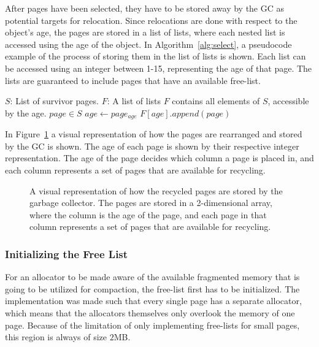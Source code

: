 After pages have been selected, they have to be stored away by the GC as potential targets for relocation. Since relocations are done with respect to the object's age, the pages are stored in a list of lists, where each nested list is accessed using the age of the object. In Algorithm~\ref{alg:select}, a pseudocode example of the process of storing them in the list of lists is shown. Each list can be accessed using an integer between 1-15, representing the age of that page. The lists are guaranteed to include pages that have an available free-list. 

\begin{algorithm}[H]
      \caption{$(O, T, F)$}
      \label{alg:select}
      \begin{algorithmic}[1]
                \Require 
                \Statex $S$: List of survivor pages.
                \Statex $F$: A list of lists
                \Ensure 
                \Statex $F$ contains all elements of $S$, accessible by the age.
                \ForAll $page \in S$
                      \State $age \gets page_{age}$
                      \State $F[age].append(page)$
                \EndFor
      \end{algorithmic}
\end{algorithm}

In Figure~\ref{fig:generational_free_list_dict} a visual representation of how the pages are rearranged and stored by the GC is shown. The age of each page is shown by their respective integer representation. The age of the page decides which column a page is placed in, and each column represents a set of pages that are available for recycling.

\begin{figure}[H]
      \centering
      
      \caption{A visual representation of how the recycled pages are stored by the garbage collector. The pages are stored in a 2-dimensional array, where the column is the age of the page, and each page in that column represents a set of pages that are available for recycling.}
      \label{fig:generational_free_list_dict}
\end{figure}

\subsubsection{Initializing the Free List}
\label{sec:implement-init}
For an allocator to be made aware of the available fragmented memory that is going to be utilized for compaction, the free-list first has to be initialized. The implementation was made such that every single page has a separate allocator, which means that the allocators themselves only overlook the memory of one page. Because of the limitation of only implementing free-lists for small pages, this region is always of size $2$MB.

